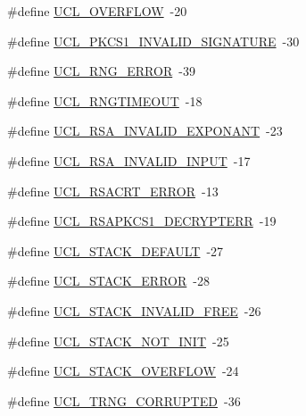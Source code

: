 \begin{DoxyCompactItemize}
\item
\#define \hyperlink{group___u_c_l___r_e_t_u_r_n_gae4f4dea3ec4f9172974dc1158ba71b38}{U\+C\+L\+\_\+\+O\+V\+E\+R\+F\+L\+OW}~-\/20
\item
\#define \hyperlink{group___u_c_l___r_e_t_u_r_n_gad99461b3bf6574c766b074bc99f1c501}{U\+C\+L\+\_\+\+P\+K\+C\+S1\+\_\+\+I\+N\+V\+A\+L\+I\+D\+\_\+\+S\+I\+G\+N\+A\+T\+U\+RE}~-\/30
\item
\#define \hyperlink{group___u_c_l___r_e_t_u_r_n_gaf2ca12b46ed9910d0fd6c70684139269}{U\+C\+L\+\_\+\+R\+N\+G\+\_\+\+E\+R\+R\+OR}~-\/39
\item
\#define \hyperlink{group___u_c_l___r_e_t_u_r_n_gab2e9fd4ffe6baddb05940f713925987d}{U\+C\+L\+\_\+\+R\+N\+G\+T\+I\+M\+E\+O\+UT}~-\/18
\item
\#define \hyperlink{group___u_c_l___r_e_t_u_r_n_ga7d4404cb6bde42e7db505a2d5a743e44}{U\+C\+L\+\_\+\+R\+S\+A\+\_\+\+I\+N\+V\+A\+L\+I\+D\+\_\+\+E\+X\+P\+O\+N\+A\+NT}~-\/23
\item
\#define \hyperlink{group___u_c_l___r_e_t_u_r_n_ga414889da044b1fb5b75bddbbcaa5c1db}{U\+C\+L\+\_\+\+R\+S\+A\+\_\+\+I\+N\+V\+A\+L\+I\+D\+\_\+\+I\+N\+P\+UT}~-\/17
\item
\#define \hyperlink{group___u_c_l___r_e_t_u_r_n_ga4dc44a3e019d63cdc495c3bd16db6896}{U\+C\+L\+\_\+\+R\+S\+A\+C\+R\+T\+\_\+\+E\+R\+R\+OR}~-\/13
\item
\#define \hyperlink{group___u_c_l___r_e_t_u_r_n_ga25d316534793eaa2df377427d259ac84}{U\+C\+L\+\_\+\+R\+S\+A\+P\+K\+C\+S1\+\_\+\+D\+E\+C\+R\+Y\+P\+T\+E\+RR}~-\/19
\item
\#define \hyperlink{group___u_c_l___r_e_t_u_r_n_gaa1cd90433b369b79056ecaaf7061f6ad}{U\+C\+L\+\_\+\+S\+T\+A\+C\+K\+\_\+\+D\+E\+F\+A\+U\+LT}~-\/27
\item
\#define \hyperlink{group___u_c_l___r_e_t_u_r_n_ga7e7f411c20b460de9d77ac3612f21112}{U\+C\+L\+\_\+\+S\+T\+A\+C\+K\+\_\+\+E\+R\+R\+OR}~-\/28
\item
\#define \hyperlink{group___u_c_l___r_e_t_u_r_n_gaed949439b5c3cd443b511320c649d43e}{U\+C\+L\+\_\+\+S\+T\+A\+C\+K\+\_\+\+I\+N\+V\+A\+L\+I\+D\+\_\+\+F\+R\+EE}~-\/26
\item
\#define \hyperlink{group___u_c_l___r_e_t_u_r_n_ga2346c721ea6b4512d78a6ab6111f86a2}{U\+C\+L\+\_\+\+S\+T\+A\+C\+K\+\_\+\+N\+O\+T\+\_\+\+I\+N\+IT}~-\/25
\item
\#define \hyperlink{group___u_c_l___r_e_t_u_r_n_ga67bcb682a8d0dfd2bcc2f8f632757901}{U\+C\+L\+\_\+\+S\+T\+A\+C\+K\+\_\+\+O\+V\+E\+R\+F\+L\+OW}~-\/24
\item
\#define \hyperlink{group___u_c_l___r_e_t_u_r_n_gaa0a103590fcf2d1ab7435c0a065ab7c0}{U\+C\+L\+\_\+\+T\+R\+N\+G\+\_\+\+C\+O\+R\+R\+U\+P\+T\+ED}~-\/36

\end{DoxyCompactItemize}
